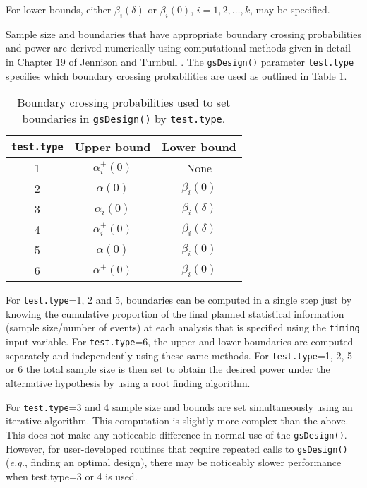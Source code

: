 For lower bounds, either $\beta_i(\delta)$ or $\beta_i(0)$, $i=1,2,\ldots,k$, may be specified. 

Sample size and boundaries that have appropriate boundary crossing probabilities and power are derived numerically using computational methods given in detail in Chapter 19 of Jennison and Turnbull \cite{JTBook}. The \texttt{gsDesign()} parameter \texttt{test.type} specifies which boundary crossing probabilities are used as outlined in Table \ref{tab:testtype}.
\begin{table}[t]
\begin{center}
\caption{Boundary crossing probabilities used to set boundaries in \texttt{gsDesign()} by \texttt{test.type}.}\label{tab:testtype}
\begin{tabular}[c]{ccc}
\texttt{test.type}&Upper bound & Lower bound\\\hline
1& $\alpha_i^{+}(0)$ & None\\
2&$\alpha(0)$ & $\beta_i(0)$\\
3&$\alpha_i(0)$ & $\beta_i(\delta)$\\
4&$\alpha_i^{+}(0)$ & $\beta_i(\delta)$\\
5&$\alpha(0)$ & $\beta_i(0)$\\
6&$\alpha^{+}(0)$ & $\beta_i(0)$
\end{tabular}
\end{center}
\end{table}

For \texttt{test.type}=1, 2 and 5, boundaries can be computed in a single step
just by knowing the cumulative proportion of the final planned statistical information (sample size/number of events) at each analysis that is specified using the \texttt{timing} input variable. 
For \texttt{test.type}=6, the upper and lower boundaries are computed separately and independently using these same methods. For \texttt{test.type}=1, 2, 5 or 6 the total sample size is then set to obtain the desired power under the alternative hypothesis by using a root finding algorithm.

For \texttt{test.type}=3 and 4 sample size and bounds are set
simultaneously using an iterative algorithm. 
This computation is slightly more complex than the above. 
This does not make any noticeable difference in normal use of the \texttt{gsDesign()}. 
However, for user-developed routines that require repeated calls to \texttt{gsDesign()} ({\it e.g.}, finding an optimal design), there may be noticeably slower performance when test.type=3 or 4 is used.
